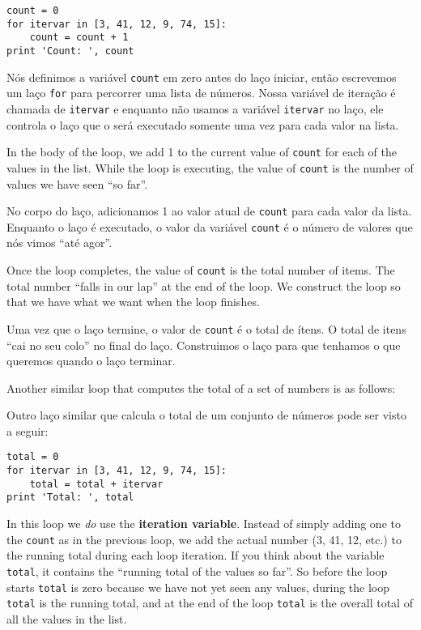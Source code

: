\beforeverb
\begin{verbatim}
count = 0
for itervar in [3, 41, 12, 9, 74, 15]:
    count = count + 1
print 'Count: ', count
\end{verbatim}
\afterverb
%

%
Nós definimos a variável {\tt count} em zero antes do laço iniciar, então
escrevemos um laço {\tt for} para percorrer uma lista de números. Nossa
variável de iteração é chamada de {\tt itervar} e enquanto não usamos a
variável {\tt itervar} no laço, ele controla o laço que o será executado
somente uma vez para cada valor na lista.

In the body of the loop, we add 1 to the current value of {\tt count}
for each of the values in the list.  While the loop is executing, the 
value of {\tt count} is the number of values we have seen ``so far''.

No corpo do laço, adicionamos 1 ao valor atual de {\tt count} para cada valor
da lista. Enquanto o laço é executado, o valor da variável {\tt count} é o
número de valores que nós vimos ``até agor''.

Once the loop completes, the value of {\tt count} is the total number
of items.   The total number ``falls in our lap'' at the end of the 
loop.  We construct the loop so that we have what we want when the loop
finishes.

Uma vez que o laço termine, o valor de {\tt count} é o total de ítens. O
total de itens ``cai no seu colo'' no final do laço. Construimos o laço para
que tenhamos o que queremos quando o laço terminar.

Another similar loop that computes the total of a set of numbers
is as follows:

Outro laço similar que calcula o total de um conjunto de números pode ser
visto a seguir:

\beforeverb
\begin{verbatim}
total = 0
for itervar in [3, 41, 12, 9, 74, 15]:
    total = total + itervar
print 'Total: ', total
\end{verbatim}
\afterverb
%
In this loop we \emph{do} use the {\bf iteration variable}.
Instead of simply adding one to the {\tt count} as in the previous loop, 
we add the actual number (3, 41, 12, etc.) to the running 
total during each loop iteration.
If you think about the variable {\tt total}, it contains the 
``running total of the values so far''.  So before the loop
starts {\tt total} is zero because we have not yet seen any values,
during the loop {\tt total} is the running total, and at the end of 
the loop {\tt total} is the overall total of all the values 
in the list.

